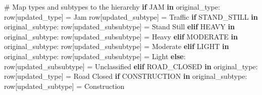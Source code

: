 \documentclass[
  letterpaper,
  DIV=11,
  numbers=noendperiod]{scrartcl}
\newenvironment{Shaded}{\begin{snugshade}}{\end{snugshade}}
\newcommand{\CommentTok}[1]{\textcolor[rgb]{0.37,0.37,0.37}{#1}}
\newcommand{\ControlFlowTok}[1]{\textcolor[rgb]{0.00,0.23,0.31}{\textbf{#1}}}
\newcommand{\KeywordTok}[1]{\textcolor[rgb]{0.00,0.23,0.31}{\textbf{#1}}}
\newcommand{\NormalTok}[1]{\textcolor[rgb]{0.00,0.23,0.31}{#1}}
\newcommand{\OperatorTok}[1]{\textcolor[rgb]{0.37,0.37,0.37}{#1}}
\newcommand{\StringTok}[1]{\textcolor[rgb]{0.13,0.47,0.30}{#1}}
\begin{document}
\begin{Shaded}
\begin{Highlighting}[]
    \CommentTok{\# Map types and subtypes to the hierarchy}
    \ControlFlowTok{if} \StringTok{\textquotesingle{}JAM\textquotesingle{}} \KeywordTok{in}\NormalTok{ original\_type:}
\NormalTok{        row[}\StringTok{\textquotesingle{}updated\_type\textquotesingle{}}\NormalTok{] }\OperatorTok{=} \StringTok{\textquotesingle{}Jam\textquotesingle{}}
\NormalTok{        row[}\StringTok{\textquotesingle{}updated\_subtype\textquotesingle{}}\NormalTok{] }\OperatorTok{=} \StringTok{\textquotesingle{}Traffic\textquotesingle{}}
        \ControlFlowTok{if} \StringTok{\textquotesingle{}STAND\_STILL\textquotesingle{}} \KeywordTok{in}\NormalTok{ original\_subtype:}
\NormalTok{            row[}\StringTok{\textquotesingle{}updated\_subsubtype\textquotesingle{}}\NormalTok{] }\OperatorTok{=} \StringTok{\textquotesingle{}Stand Still\textquotesingle{}}
        \ControlFlowTok{elif} \StringTok{\textquotesingle{}HEAVY\textquotesingle{}} \KeywordTok{in}\NormalTok{ original\_subtype:}
\NormalTok{            row[}\StringTok{\textquotesingle{}updated\_subsubtype\textquotesingle{}}\NormalTok{] }\OperatorTok{=} \StringTok{\textquotesingle{}Heavy\textquotesingle{}}
        \ControlFlowTok{elif} \StringTok{\textquotesingle{}MODERATE\textquotesingle{}} \KeywordTok{in}\NormalTok{ original\_subtype:}
\NormalTok{            row[}\StringTok{\textquotesingle{}updated\_subsubtype\textquotesingle{}}\NormalTok{] }\OperatorTok{=} \StringTok{\textquotesingle{}Moderate\textquotesingle{}}
        \ControlFlowTok{elif} \StringTok{\textquotesingle{}LIGHT\textquotesingle{}} \KeywordTok{in}\NormalTok{ original\_subtype:}
\NormalTok{            row[}\StringTok{\textquotesingle{}updated\_subsubtype\textquotesingle{}}\NormalTok{] }\OperatorTok{=} \StringTok{\textquotesingle{}Light\textquotesingle{}}
        \ControlFlowTok{else}\NormalTok{:}
\NormalTok{            row[}\StringTok{\textquotesingle{}updated\_subsubtype\textquotesingle{}}\NormalTok{] }\OperatorTok{=} \StringTok{\textquotesingle{}Unclassified\textquotesingle{}}
    \ControlFlowTok{elif} \StringTok{\textquotesingle{}ROAD\_CLOSED\textquotesingle{}} \KeywordTok{in}\NormalTok{ original\_type:}
\NormalTok{        row[}\StringTok{\textquotesingle{}updated\_type\textquotesingle{}}\NormalTok{] }\OperatorTok{=} \StringTok{\textquotesingle{}Road Closed\textquotesingle{}}
        \ControlFlowTok{if} \StringTok{\textquotesingle{}CONSTRUCTION\textquotesingle{}} \KeywordTok{in}\NormalTok{ original\_subtype:}
\NormalTok{            row[}\StringTok{\textquotesingle{}updated\_subtype\textquotesingle{}}\NormalTok{] }\OperatorTok{=} \StringTok{\textquotesingle{}Construction\textquotesingle{}}

\end{Highlighting}
\end{Shaded}
\end{document}
